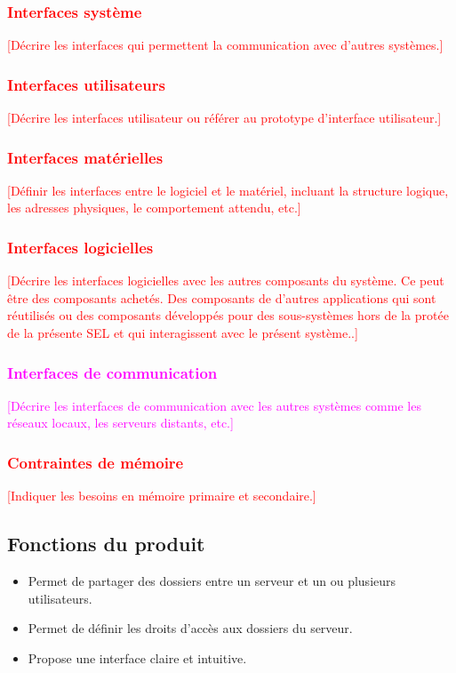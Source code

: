\documentclass[10pt,a4paper]{report}
\begin{document}
\textcolor{red}{\subsubsection{Interfaces système}
[Décrire les interfaces qui permettent la communication avec d’autres systèmes.]}

\textcolor{red}{\subsubsection{Interfaces utilisateurs}
[Décrire les interfaces utilisateur ou référer au prototype d’interface utilisateur.]}

\textcolor{red}{\subsubsection{Interfaces matérielles}
[Définir les interfaces entre le logiciel et le matériel, incluant la structure logique, les adresses physiques, le comportement attendu, etc.]}

\textcolor{red}{\subsubsection{Interfaces logicielles}
[Décrire les interfaces logicielles avec les autres composants du système. Ce peut être des composants achetés. Des composants de d’autres applications qui sont réutilisés ou des composants développés pour des sous-systèmes hors de la protée de la présente SEL et qui interagissent avec le présent système..]}

\textcolor{magenta}{\subsubsection{Interfaces de communication}
[Décrire les interfaces de communication avec les autres systèmes comme les réseaux locaux, les serveurs distants, etc.]}

\textcolor{red}{\subsubsection{Contraintes de mémoire}
[Indiquer les besoins en mémoire primaire et secondaire.]}

\subsection{Fonctions du produit}
\begin{itemize}
\item Permet de partager des dossiers entre un serveur et un ou plusieurs utilisateurs.
\item Permet de définir les droits d'accès aux dossiers du serveur.
\item Propose une interface claire et intuitive.
\end{itemize}
\end{document}
